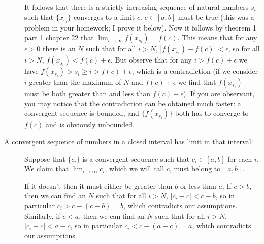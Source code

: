 \documentclass[12pt]{article}
\begin{document}
\begin{description}
It follows that there is a strictly increasing sequence of natural numbers $s_i$ such that $\{x_{s_i}\}$  converges to a limit $c$.  $c \in [a,b]$ must be true (this was a problem in your homework; I prove it below).
Now it follows by theorem 1 part 1 chapter 22 that $\lim_{i \rightarrow \infty}f(x_{s_i}) = f(c)$.  This means that for any $\epsilon>0$ there is an $N$ such that for all $i>N$, $|f(x_{s_i})-f(c)|<\epsilon$,
so for all $i>N$, $f(x_{s_i})<f(c)+\epsilon$.  But observe that for any $i>f(c)+\epsilon$ we have $f(x_{s_i})>s_i\geq i>f(c)+\epsilon$, which is a contradiction (if we consider $i$ greater than the maximum of $N$
and $f(c)+\epsilon$ we find that $f(x_{s_i})$ must be both greater than and less than $f(c)+\epsilon$).  If you are observant, you may notice that the contradiction can be obtained much faster:  a convergent sequence is bounded,
and $\{ f(x_{s_i})\}$ both has to converge to $f(c)$ and is obviously unbounded.

\item[A convergent sequence of numbers in a closed interval has limit in that interval:]

Suppose that $\{c_i\}$ is a convergent sequence such that $c_i \in [a,b]$ for each $i$.  We claim that $\lim_{i \rightarrow \infty}c_i$, which we will call $c$, must belong to $[a,b]$.

If it doesn't then it must either be greater than $b$ or less than $a$.  If $c>b$, then we can find an $N$ such that for all $i>N$, $|c_i-c|<c-b$, so in particular $c_i>c-(c-b)=b$, which contradicts our assumptions.
Similarly,  if $c<a$, then we can find an $N$ such that for all $i>N$, $|c_i-c|<a-c$, so in particular $c_i<c-(a-c)=a$, which contradicts our assumptions.




\end{description}
\end{document}
